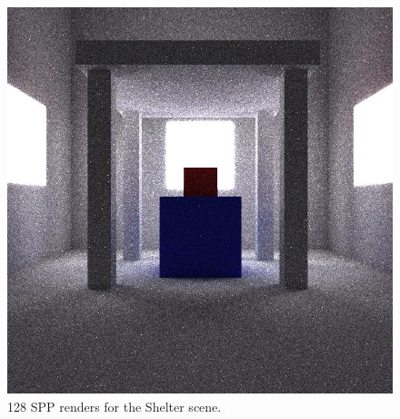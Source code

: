 \documentclass[ %
                    author={Callum Pearce},
                supervisor={Dr. Neill Campbell},
                    degree={MEng},
                     title={Learning the incident radiance for a continuous state space rather than a discrete one is more beneficial for Importance Sampling in Monte Carlo Path tracing},
                  subtitle={},
                      type={research},
                      year={2019} ]{dissertation}
\begin{document}
\begin{figure}[h]
\endminipage\hspace{1em}
  \includegraphics[width=\textwidth]{images/renders/shelter/nn.png}
\endminipage
\caption{128 SPP renders for the Shelter scene.}
\label{fig:shelter}
\end{figure}
\end{document}
